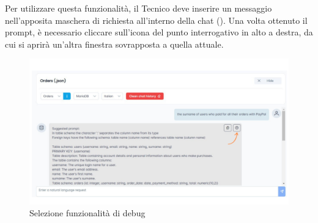 \par Per utilizzare questa funzionalità, il Tecnico deve inserire un messaggio nell'apposita maschera di richiesta all'interno della chat (). Una volta ottenuto il prompt, è necessario cliccare sull'icona del punto interrogativo in alto a destra, da cui si aprirà un'altra finestra sovrapposta a quella attuale.

\begin{figure}[H]
  \centering
  \includegraphics[width=\textwidth]{assets/tasto_info_debug.png}
  \caption{Selezione funzionalità di debug}
\end{figure}


